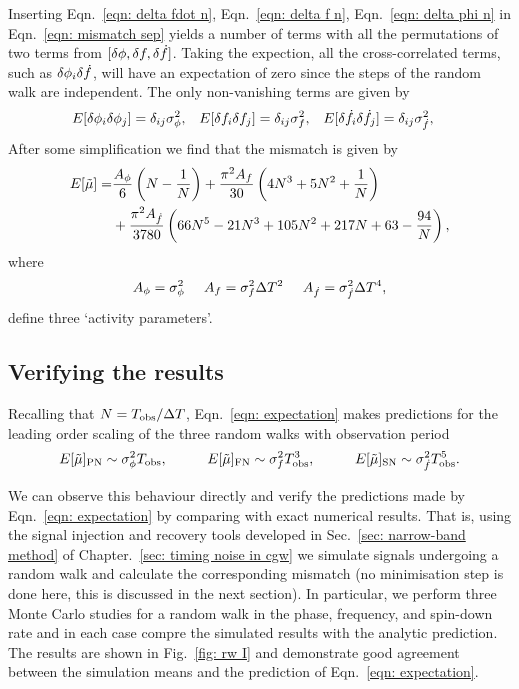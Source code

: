 Inserting Eqn.~\eqref{eqn: delta fdot n}, Eqn.~\eqref{eqn: delta f n},
Eqn.~\eqref{eqn: delta phi n}  in Eqn.~\eqref{eqn: mismatch sep} yields a
number of terms with all the permutations of two terms from $[\delta \phi, \delta f,
\delta \dot{f}]$. Taking the expection, all the cross-correlated terms, such as
$\delta\phi_{i}\delta \dot{f}$, will have an expectation of zero since the steps of the
random walk are independent. The only non-vanishing terms are given by
\begin{align}
E[\delta\phi_{i}\delta\phi_{j}] &= \delta_{ij}\sigma_{\phi}^{2}, &
E[\delta f_{i}\delta f_{j}] &= \delta_{ij}\sigma_{f}^{2},&
E[\delta\dot{f}_{i}\delta\dot{f}_{j}] &= \delta_{ij}\sigma_{\dot{f}}^{2},
\end{align}
After some simplification we find that the mismatch is given by
\begin{align}
\begin{split}
E[\tilde{\mu}]   = &  \frac{A_{\phi}}{6} \left(N - \frac{1}{N}\right)
+ \frac{\pi^{2} A_{{f}}}{30}\left(4 N^{3} + 5 N^{2} + \frac{1}{N}\right)\\
 & +  \frac{\pi^{2} A_{{\dot{f}}}}{3780} \left(66 N^{5} - 21 N^{3} + 105 N^{2}
 + 217 N + 63 - \frac{94}{N}\right),
\end{split}
\label{eqn: expectation}
\end{align}
where
\begin{equation}
	A_{\phi} = \sigma_{\phi}^{2} \;\;\;\;\;
    A_{f} = \sigma_{f}^{2}\Delta T^{2} \;\;\;\;\;
    A_{\dot{f}} = \sigma_{\dot{f}}^{2}\Delta T^{4},
\end{equation}
define three `activity parameters'.

\subsection{Verifying the results}
Recalling that $N=T_{\mathrm{obs}}/\Delta T$, Eqn.~\eqref{eqn: expectation} makes
predictions for the leading order
scaling of the three random walks with observation period
\begin{equation}
E[\mutilde]_{\mathrm{PN}} \sim \sigP \Tobs, \hspace{10mm}
E[\mutilde]_{\mathrm{FN}} \sim \sigF \Tobs^{3}, \hspace{10mm}
E[\mutilde]_{\mathrm{SN}} \sim \sigS \Tobs^{5}.
\end{equation}

We can observe this behaviour directly and verify the predictions made by
Eqn.~\eqref{eqn: expectation} by comparing with exact numerical results. That
is, using the signal injection and recovery tools developed in Sec.~\ref{sec:
narrow-band method} of Chapter.~\ref{sec: timing noise in cgw} we simulate
signals undergoing a random walk and calculate the corresponding mismatch (no
minimisation step is done here, this is discussed in the next section). In
particular, we perform three Monte Carlo studies for a random walk in the
phase, frequency, and spin-down rate and in each case compre the simulated
results with the analytic prediction. The results are shown in Fig.~\ref{fig: rw I}
and demonstrate good agreement between the simulation means and the prediction
of Eqn.~\eqref{eqn: expectation}.

